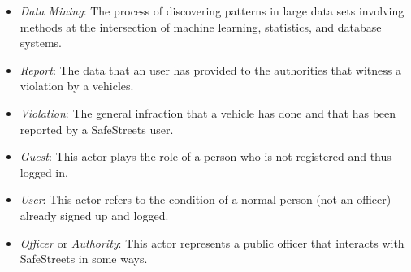 \begin{itemize}
	\item \textit{Data Mining}: The process of discovering patterns in large data sets involving methods at the intersection of machine learning, statistics, and database systems.
	\item \textit{Report}: The data that an user has provided to the authorities that witness a violation by a vehicles.
	\item \textit{Violation}: The general infraction that a vehicle has done and that has been reported by a SafeStreets user.\\
	\item \textit{Guest}: This actor plays the role of a person who is not registered and thus logged in.
	\item \textit{User}: This actor refers to the condition of a normal person (not an officer) already signed up and logged.
	\item \textit{Officer} or \textit{Authority}: This actor represents a public officer that interacts with SafeStreets in some ways.
\end{itemize}